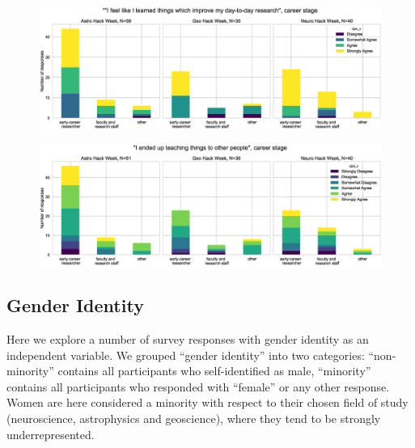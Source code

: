 \documentclass{aastex62}
\begin{document}
\begin{figure}[h!]
\centering
\includegraphics[width=\textwidth]{Q24_4_Q3_stackedbars.eps}
\caption{}
\label{fig:corr3}
\end{figure}

\begin{figure}[h!]
\centering
\includegraphics[width=\textwidth]{Q23_2_Q3_stackedbars.eps}
\caption{}
\label{fig:corr4}
\end{figure}

\clearpage 

\subsection{Gender Identity}

Here we explore a number of survey responses with gender identity as an independent variable. We grouped ``gender identity'' into two categories: ``non-minority'' contains all participants who self-identified as male, ``minority'' contains all participants who responded with ``female'' or any other response. Women are here considered a minority with respect to their chosen field of study (neuroscience, astrophysics and geoscience), where they tend to be strongly underrepresented. 
\end{document}
